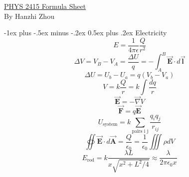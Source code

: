 \documentclass[12pt,landscape]{article}
\makeatletter
\renewcommand{\section}{\@startsection{section}{1}{0mm}%
                                {-1ex plus -.5ex minus -.2ex}%
                                {0.5ex plus .2ex}%
                                {\normalfont\large\bfseries}}
\makeatother
\begin{document}
\raggedright
\footnotesize
\begin{multicols}{4}

    \setlength{\premulticols}{1pt}
    \setlength{\postmulticols}{1pt}
    \setlength{\multicolsep}{1pt}
    \setlength{\columnsep}{2pt}
    \setlength{\mathindent}{0pt}
    \newcommand{\overbar}[1]{\mkern 1.5mu\overline{\mkern-1.5mu#1\mkern-1.5mu}\mkern 1.5mu}

    \begin{center}
        \Large{\underline{PHYS 2415 Formula Sheet}} \\
        \large By Hanzhi Zhou
    \end{center}

    \section{Electricity}
    \begin{equation*}
        E = \frac{1}{4 \pi \epsilon} \frac{Q}{r^2}
    \end{equation*}
    \begin{equation*}
        \Delta V = V_B - V_A = \frac{\Delta U}{q} = -\int_{A}^{B} \vec{\mathbf{E}} \cdot d\vec{\mathbf{l}}
    \end{equation*}
    \begin{equation*}
        \Delta U = U_b - U_a = q(V_b - V_a)
    \end{equation*}
    \begin{equation*}
        V = k\frac{Q}{r} = k \int \frac{dq}{r}
    \end{equation*}
    \begin{equation*}
        \vec{\mathbf{E}} = - \vec{\nabla} V
    \end{equation*}
    \begin{equation*}
        \vec{\mathbf{F}} = q\vec{\mathbf{E}}
    \end{equation*}
    \begin{equation*}
        U_{\text{system}} = k \sum_{\text{pairs i j}} \frac{q_i q_j}{r_{ij}}
    \end{equation*}
    \begin{equation*}
        \oiint \vec{\mathbf{E}} \cdot d \vec{\mathbf{A}} = \frac{Q}{\epsilon_0} = \frac{1}{\epsilon_0} \iiint \rho dV
    \end{equation*}
    \begin{equation*}
        E_{\text{rod}} = k \frac{\lambda L}{x \sqrt{x^2 + L^2 / 4}} \approx \frac{\lambda}{2\pi \epsilon_0 x }

\end{equation*}
\end{multicols}
\end{document}
